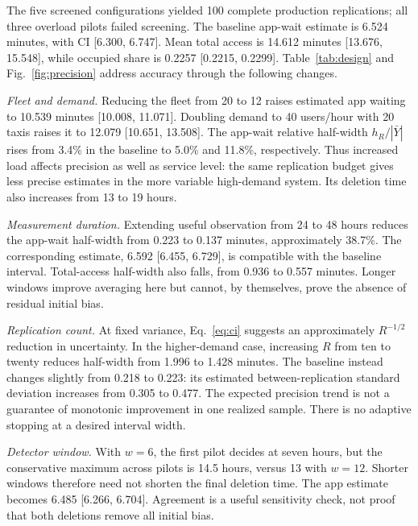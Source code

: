\documentclass[10pt,twocolumn,letterpaper]{article}
\begin{document}
The five screened configurations yielded 100 complete production replications;
all three overload pilots failed screening. The baseline app-wait estimate is
6.524 minutes, with CI [6.300, 6.747]. Mean total access is 14.612 minutes
[13.676, 15.548], while occupied share is 0.2257 [0.2215, 0.2299]. Table~\ref{tab:design}
and Fig.~\ref{fig:precision} address accuracy through the following changes.

\textit{Fleet and demand.} Reducing the fleet from 20 to 12 raises estimated
app waiting to 10.539 minutes [10.008, 11.071]. Doubling demand to 40 users/hour
with 20 taxis raises it to 12.079 [10.651, 13.508]. The app-wait relative
half-width $h_R/|\bar Y|$ rises from 3.4\% in the baseline to 5.0\% and 11.8\%,
respectively. Thus increased load affects precision as well as service level:
the same replication budget gives less precise estimates in the more variable
high-demand system. Its deletion time also increases from 13 to 19 hours.

\textit{Measurement duration.} Extending useful observation from 24 to 48 hours
reduces the app-wait half-width from 0.223 to 0.137 minutes, approximately
38.7\%. The corresponding estimate, 6.592 [6.455, 6.729], is compatible with the
baseline interval. Total-access half-width also falls, from 0.936 to 0.557
minutes. Longer windows improve averaging here but cannot, by themselves,
prove the absence of residual initial bias.

\textit{Replication count.} At fixed variance, Eq.~\eqref{eq:ci} suggests an
approximately $R^{-1/2}$ reduction in uncertainty. In the higher-demand case,
increasing $R$ from ten to twenty reduces half-width from 1.996 to 1.428
minutes. The baseline instead changes slightly from 0.218 to 0.223: its
estimated between-replication standard deviation increases from 0.305 to 0.477.
The expected precision trend is not a guarantee of monotonic improvement in
one realized sample. There is no adaptive stopping at a desired interval width.

\textit{Detector window.} With $w=6$, the first pilot decides at seven hours,
but the conservative maximum across pilots is 14.5 hours, versus 13 with
$w=12$. Shorter windows therefore need not shorten the final deletion time.
The app estimate becomes 6.485 [6.266, 6.704]. Agreement is a useful sensitivity
check, not proof that both deletions remove all initial bias.
\end{document}
